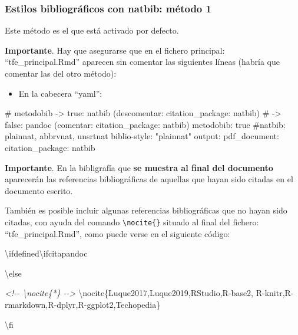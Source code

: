 \documentclass[12pt,a4paper,oneside,]{article}
\newenvironment{Shaded}{\begin{snugshade}}{\end{snugshade}}
\newcommand{\CommentTok}[1]{\textcolor[rgb]{0.56,0.35,0.01}{\textit{#1}}}
\newcommand{\FunctionTok}[1]{\textcolor[rgb]{0.00,0.00,0.00}{#1}}
\newcommand{\NormalTok}[1]{#1}
\providecommand{\tightlist}{%
  \setlength{\itemsep}{0pt}\setlength{\parskip}{0pt}}
\numberwithin{dummy}{section}
\theoremstyle{ocrenumbox}
\theoremstyle{blacknumex}
\theoremstyle{blacknumbox}
\theoremstyle{ocrenum}
\theoremstyle{ocrenum}
\begin{document}
\hypertarget{estilos-bibliogruxe1ficos-con-natbib-muxe9todo-1}{%
\subsubsection{Estilos bibliográficos con natbib: método
1}\label{estilos-bibliogruxe1ficos-con-natbib-muxe9todo-1}}

Este método es el que está activado por defecto.

\textbf{Importante}. Hay que asegurarse que en el fichero principal:
``tfe\_principal.Rmd'' aparecen sin comentar las siguientes líneas
(habría que comentar las del otro método):

\begin{itemize}
\tightlist
\item
  En la cabecera ``yaml'':
\end{itemize}

\footnotesize

\begin{Shaded}
\begin{Highlighting}[]
\FunctionTok{\# metodobib {-}\textgreater{} true: natbib (descomentar: citation\_package: natbib) }
\FunctionTok{\#           {-}\textgreater{} false: pandoc (comentar: citation\_package: natbib)}
\NormalTok{metodobib: true}
\NormalTok{\#natbib: plainnat, abbrvnat, unsrtnat}
\NormalTok{biblio{-}style: "plainnat"}
\NormalTok{output: }
\NormalTok{  pdf\_document: }
\NormalTok{    citation\_package: natbib}
\end{Highlighting}
\end{Shaded}

\normalsize

\textbf{Importante}. En la bibligrafía que \textbf{se muestra al final
del documento} aparecerán las referencias bibliográficas de aquellas que
hayan sido citadas en el documento escrito.

También es posible incluir algunas referencias bibliográficas que no
hayan sido citadas, con ayuda del comando
\texttt{\textbackslash{}nocite\{\}} situado al final del fichero:
``tfe\_principal.Rmd'', como puede verse en el siguiente código:

\footnotesize

\begin{Shaded}
\begin{Highlighting}[]
\NormalTok{\textbackslash{}ifdefined\textbackslash{}ifcitapandoc}

\NormalTok{\textbackslash{}else}

\CommentTok{\textless{}!{-}{-} \textbackslash{}nocite\{*\} {-}{-}\textgreater{}}
\NormalTok{\textbackslash{}nocite\{Luque2017,Luque2019,RStudio,R{-}base2,}
\NormalTok{R{-}knitr,R{-}rmarkdown,R{-}dplyr,R{-}ggplot2,Techopedia\}}

\NormalTok{\textbackslash{}fi }
\end{Highlighting}
\end{Shaded}
\end{document}
